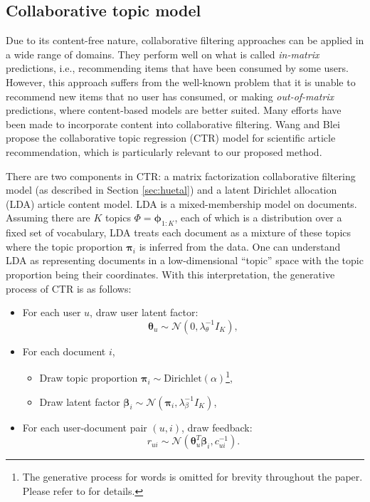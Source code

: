 \subsection{Collaborative topic model}\label{sec:ctm}

Due to its content-free nature, collaborative filtering approaches can be applied in a wide range of domains. They perform well on what is called \emph{in-matrix} predictions, i.e., recommending items that have been consumed by some users. However, this approach suffers from the well-known problem that it is unable to recommend new items that no user has consumed, or making \emph{out-of-matrix} predictions, where content-based models are better suited. Many efforts have been made to incorporate content into collaborative filtering. Wang and Blei\cite{wang2011collaborative} propose the collaborative topic regression (CTR) model for scientific article recommendation, which is particularly relevant to our proposed method.  

There are two components in CTR: a matrix factorization collaborative filtering model (as described in Section \ref{sec:huetal}) and a latent Dirichlet allocation (LDA) article content model. LDA \cite{blei2003latent} is a mixed-membership model on documents. Assuming there are $K$ topics $\Phi = \boldsymbol\phi_{1:K}$, each of which is a distribution over a fixed set of vocabulary, LDA treats each document as a mixture of these topics where the topic proportion $\boldsymbol\pi_i$ is inferred from the data.
One can understand LDA as representing documents in a low-dimensional ``topic'' space with the topic proportion being their coordinates. With this interpretation, the generative process of CTR is as follows: 
\begin{itemize}
\item For each user $u$, draw user latent factor:
\vspace{-0.05in}
\[\boldsymbol\theta_u \sim \mathcal{N}(0, \lambda_\theta^{-1} I_K),\]
\item \vspace{-0.1in}
For each document $i$, 
\begin{itemize}
\item Draw topic proportion $\boldsymbol\pi_i \sim \text{Dirichlet}(\alpha)$\footnote{The generative process for words is omitted for brevity throughout the paper. Please refer to \cite{wang2011collaborative} for details.},
\item Draw latent factor $\boldsymbol\beta_i \sim \mathcal{N}(\boldsymbol\pi_i, \lambda_\beta^{-1} I_K)$,
 \end{itemize}
\item For each user-document pair $(u, i)$, draw feedback: 
\[r_{ui} \sim \mathcal{N}(\boldsymbol\theta_u^T\boldsymbol\beta_i, c_{ui}^{-1}).\]
\end{itemize}


